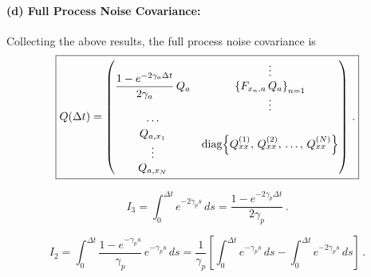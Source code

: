 \documentclass[]{scrartcl}
\begin{document}
	\paragraph{(d) Full Process Noise Covariance:}  
	Collecting the above results, the full process noise covariance is
	\begin{equation}
	\boxed{
	Q(\Delta t) =
	\begin{pmatrix}
	\displaystyle \frac{1 - e^{-2\gamma_a\Delta t}}{2\gamma_a}\, Q_a & \begin{array}{c}\vdots\\ \left\{ F_{x_n,a}\,Q_a \right\}_{n=1} \\ \vdots \end{array} \\[2mm]
	\begin{array}{c}\cdots \\ Q_{a,x_1} \\ \vdots \\ Q_{a,x_N} \end{array} & \mathrm{diag}\Bigl\{ Q_{xx}^{(1)},\, Q_{xx}^{(2)},\, \dots,\, Q_{xx}^{(N)} \Bigr\}
	\end{pmatrix}\,.}
	\end{equation}
	
	



%
%
%
%

\begin{equation}
	I_3 = \int_0^{\Delta t} e^{-2\gamma_p s}\, ds 
	= \frac{1 - e^{-2\gamma_p \Delta t}}{2\gamma_p}\,.
	\end{equation}
	
	\begin{equation}
	I_2 = \int_0^{\Delta t} \frac{1 - e^{-\gamma_p s}}{\gamma_p}\, e^{- \gamma_p s}\, ds 
	= \frac{1}{\gamma_p} \left[ \int_0^{\Delta t} e^{-\gamma_p s}\, ds - \int_0^{\Delta t} e^{-2\gamma_p s}\, ds \right]\,.
	\end{equation}
	
\end{document}
